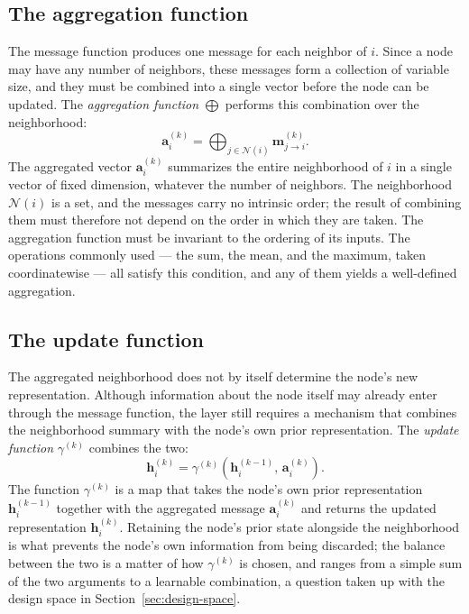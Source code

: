 \subsection{The aggregation function}
\label{sec:aggregation-function}

The message function produces one message for each neighbor of $i$. Since a
node may have any number of neighbors, these messages form a collection of
variable size, and they must be combined into a single vector before the node
can be updated. The \textit{aggregation function} $\bigoplus$ performs this
combination over the neighborhood:
\begin{equation}
  \mathbf{a}_i^{(k)}
    = \bigoplus_{j \in \mathcal{N}(i)} \mathbf{m}_{j \to i}^{(k)}.
  \label{eq:aggregation-function}
\end{equation}
The aggregated vector $\mathbf{a}_i^{(k)}$ summarizes the entire neighborhood of
$i$ in a single vector of fixed dimension, whatever the number of neighbors.
The neighborhood $\mathcal{N}(i)$ is a set, and
the messages carry no intrinsic order; the result of combining them must
therefore not depend on the order in which they are taken. The aggregation
function must be invariant to the ordering of its inputs. The operations
commonly used --- the sum, the mean, and the maximum, taken coordinatewise ---
all satisfy this condition, and any of them yields a well-defined aggregation.

\subsection{The update function}
\label{sec:update-function}

The aggregated neighborhood does not by itself determine the node's new
representation. Although information about the node itself may already enter
through the message function, the layer still requires a mechanism that
combines the neighborhood summary with the node's own prior representation. 
The \textit{update function} $\gamma^{(k)}$ combines the two:
\begin{equation}
  \mathbf{h}_i^{(k)}
    = \gamma^{(k)}\!\left(
        \mathbf{h}_i^{(k-1)},\,
        \mathbf{a}_i^{(k)}
      \right).
  \label{eq:update-function}
\end{equation}
The function $\gamma^{(k)}$ is a map that takes the node's own prior
representation $\mathbf{h}_i^{(k-1)}$ together with the aggregated message
$\mathbf{a}_i^{(k)}$ and returns the updated representation $\mathbf{h}_i^{(k)}$.
Retaining the node's prior state alongside the neighborhood is what prevents the
node's own information from being discarded; the
balance between the two is a matter of how $\gamma^{(k)}$ is chosen, and
ranges from a simple sum of the two arguments to a learnable combination, a
question taken up with the design space in
Section~\ref{sec:design-space}.

